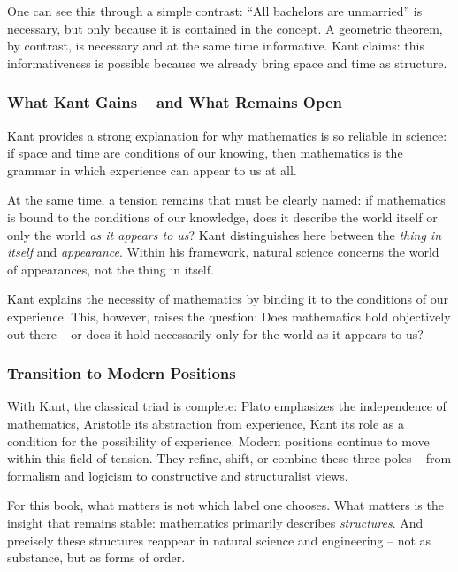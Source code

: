 One can see this through a simple contrast:
``All bachelors are unmarried''
is necessary,
but only because it is contained in the concept.
A geometric theorem, by contrast, is necessary
and at the same time informative.
Kant claims:
this informativeness is possible
because we already bring space and time as structure.

\subsubsection*{What Kant Gains -- and What Remains Open}

Kant provides a strong explanation
for why mathematics is so reliable in science:
if space and time are conditions of our knowing,
then mathematics is the grammar
in which experience can appear to us at all.

At the same time, a tension remains
that must be clearly named:
if mathematics is bound to the conditions of our knowledge,
does it describe the world itself
or only the world
\emph{as it appears to us}?
Kant distinguishes here between the \emph{thing in itself}
and \emph{appearance}.
Within his framework, natural science concerns the world of appearances,
not the thing in itself.

\begin{NoteBox}
	\label{box:kant-price}
	\small
	Kant explains the necessity of mathematics
	by binding it to the conditions of our experience.
	This, however, raises the question:
	Does mathematics hold objectively out there --
	or does it hold necessarily only for the world
	as it appears to us?
\end{NoteBox}

\subsubsection*{Transition to Modern Positions}

With Kant, the classical triad is complete:
Plato emphasizes the independence of mathematics,
Aristotle its abstraction from experience,
Kant its role as a condition for the possibility of experience.
Modern positions continue to move within this field of tension.
They refine,
shift, or combine these three poles --
from formalism and logicism
to constructive and structuralist views.

For this book, what matters is not
which label one chooses.
What matters is the insight
that remains stable:
mathematics primarily describes \emph{structures}.
And precisely these structures reappear in natural science and engineering --
not as substance,
but as forms of order.

